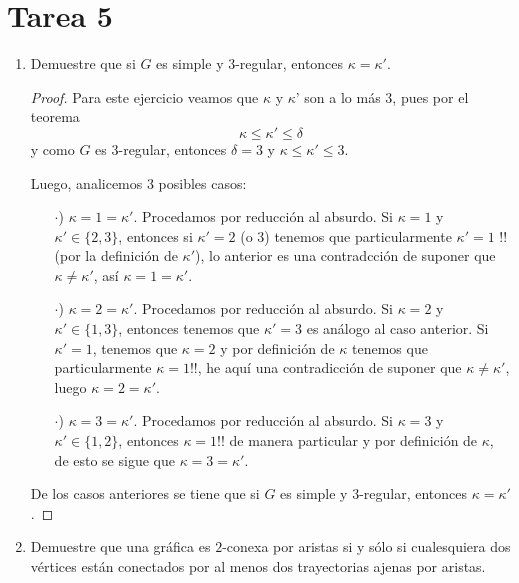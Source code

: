 \documentclass{article}
\begin{document}
\section*{\LARGE{Tarea 5}}
\begin{enumerate}
\item Demuestre que si $G$ es simple y $3$-regular, entonces $\kappa =
  \kappa'$.
  
  \renewcommand\qedsymbol{QED}
  \begin{proof}
    Para este ejercicio veamos que $\kappa$ y $\kappa$' son a lo m\'as $3$, pues por el
    teorema
    \[
    \kappa \leq \kappa ' \leq \delta
    \]
    y como $G$ es $3$-regular, entonces $\delta = 3$ y $\kappa \leq \kappa ' \leq 3$.
    
    Luego, analicemos 3 posibles casos:
    \begin{itemize}
    \item[$\cdot$)] $\kappa = 1 = \kappa '$. Procedamos por reducci\'on al absurdo.
      Si $\kappa = 1$ y $\kappa ' \in \{2, 3\}$, entonces si $\kappa ' = 2$ (o $3$)
      tenemos que particularmente $\kappa ' = 1$ !! (por la definici\'on de $\kappa '$),
      lo anterior es una contradcci\'on de suponer que $\kappa \not= \kappa '$, as\'i
      $\kappa = 1 = \kappa '$.
    \item[$\cdot$)] $\kappa = 2 = \kappa '$. Procedamos por reducci\'on al absurdo.
      Si $\kappa = 2$ y $\kappa ' \in \{1, 3\}$, entonces tenemos que $\kappa' = 3$
      es an\'alogo al caso anterior. Si $\kappa ' = 1$, tenemos que $\kappa = 2$ y
      por definici\'on de $\kappa$ tenemos que particularmente $\kappa = 1$!!, he
      aqu\'i una contradicci\'on de suponer que $\kappa \not= \kappa'$, luego
      $\kappa = 2 = \kappa '$.
    \item[$\cdot$)] $\kappa = 3 = \kappa '$. Procedamos por reducci\'on al absurdo.
      Si $\kappa = 3$ y $\kappa ' \in \{1, 2\}$, entonces $\kappa = 1$!! de manera
      particular y por definici\'on de $\kappa$, de esto se sigue que
      $\kappa = 3 = \kappa '$.
    \end{itemize}
    De los casos anteriores se tiene que si $G$ es simple y $3$-regular, entonces
    $\kappa = \kappa'$.
  \end{proof}
\item Demuestre que una gr\'afica es $2$-conexa por aristas si y s\'olo si
  cualesquiera dos v\'ertices est\'an conectados por al menos dos trayectorias
  ajenas por aristas.


\end{enumerate}
\end{document}
